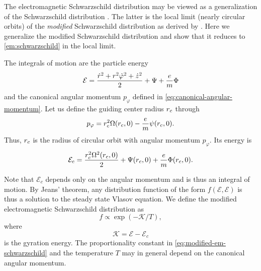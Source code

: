 \documentclass[aps,pre,notitlepage,amsmath,amssymb,amsfonts,nobibnotes,nofootinbib]{revtex4-1}
\begin{document}
The electromagnetic Schwarzschild distribution 
may be viewed as a generalization of the Schwarzschild distribution
\citep[e.g.][]{Julian1966}. The latter is the local limit (nearly circular
orbits) of the \emph{modified} Schwarzschild distribution as derived by
\citet{Shu1969}. Here we generalize the modified Schwarzschild distribution
and show that it reduces to \cref{em:schwarzschild} in the local limit.

The integrals of motion are the particle energy
\begin{equation}
  \mathcal{E} = \frac{\dot{r}^2 + r^2\dot{\varphi}^2 + \dot{z}^2}{2}
  + \Psi + \frac{e}{m}\Phi
\end{equation}
and the canonical angular momentum $p_\varphi$ defined in
\cref{eq:canonical-angular-momentum}. Let us define the guiding center radius
$r_c$ through
\begin{equation}
  p_\varphi = r_c^2\Omega(r_c,0) - \frac{e}{m}\psi(r_c,0).
\end{equation}
Thus, $r_c$ is the radius of circular orbit with angular momentum $p_\varphi$.
Its energy is
\begin{equation}
  \mathcal{E}_c = \frac{r_c^2\Omega^2(r_c,0)}{2}
  + \Psi(r_c,0) + \frac{e}{m}\Phi(r_c,0).
\end{equation}

Note that $\mathcal{E}_c$ depends only on the angular momentum and is thus an
integral of motion. By Jeans' theorem, any distribution function of the form
$f(\mathcal{E},\mathcal{E})$ is thus a solution to the steady state Vlasov
equation. We define the modified electromagnetic Schwarzschild distribution as
\begin{equation}
  \label{eq:modified-em-schwarzschild}
  f \propto \exp(-\mathcal{K}/T),
\end{equation}
where
\begin{equation}
  \label{eq:global-gyration-energy}
  \mathcal{K} = \mathcal{E} - \mathcal{E}_c
\end{equation}
is the gyration energy. The proportionality constant in
\cref{eq:modified-em-schwarzschild} and the temperature $T$ may in general
depend on the canonical angular momentum.
\end{document}
